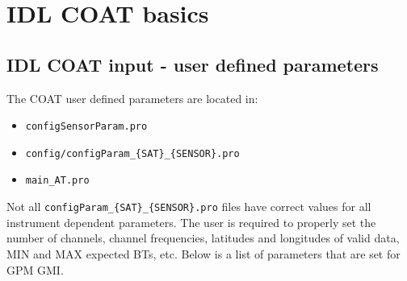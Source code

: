 \documentclass[10pt]{report}
\begin{document}
\chapter{IDL COAT basics}
\section{IDL COAT input - user defined parameters}
The COAT user defined parameters are located in: 
\begin{itemize}
  \item {\tt configSensorParam.pro}
  \item {\tt config/configParam\_\{SAT\}\_\{SENSOR\}.pro}
  \item {\tt main\_AT.pro}
\end{itemize}
Not all {\tt configParam\_\{SAT\}\_\{SENSOR\}.pro} files have correct values for 
all instrument dependent parameters.  The user is required to properly set the number of channels,
channel frequencies, latitudes and longitudes of valid data, MIN and MAX expected BTs, etc.  Below 
is a list of parameters that are set for GPM GMI.  
\end{document}
